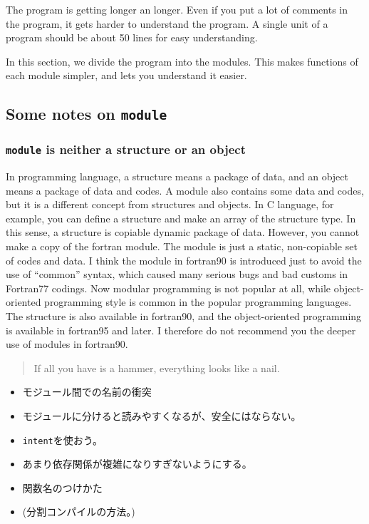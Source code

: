 \documentclass[a4,10pt]{article}
\begin{document}
The program is getting longer an longer.  Even if you put a lot of comments in the program, it gets harder to understand the program.  A single unit of a program should be about 50 lines for easy understanding.

In this section, we divide the program into the modules.  This makes functions of each module simpler, and lets you understand it easier.
\subsection{Some notes on \tt module}
\subsubsection{{\tt module} is neither a structure or an object}
In programming language, a structure means a package of data, and an object means a package of data and codes.  A module also contains some data and codes, but it is a different concept from structures and objects.  In C language, for example, you can define a structure and make an array of the structure type.  In this sense, a structure is copiable dynamic package of data.  However, you cannot make a copy of the fortran module.  The module is just a static, non-copiable set of codes and data.  I think the module in fortran90 is introduced just to avoid the use of  ``common'' syntax, which caused many serious bugs and bad customs in Fortran77 codings.  Now modular programming is not popular at all, while object-oriented programming style is common in the popular programming languages.  The structure is also available in fortran90, and the object-oriented programming is available in fortran95 and later.  I therefore do not recommend you the deeper use of modules in fortran90.
\begin{quote}
If all you have is a hammer, everything looks like a nail.
\end{quote}


\begin{itemize}
\item モジュール間での名前の衝突
\item モジュールに分けると読みやすくなるが、安全にはならない。
\item {\tt intent}を使おう。
\item あまり依存関係が複雑になりすぎないようにする。
\item 関数名のつけかた
\item (分割コンパイルの方法。)
\end{itemize}
\end{document}
